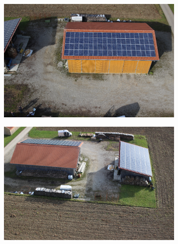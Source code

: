 \documentclass[remotesensing,article,accept,moreauthors,pdftex,10pt,a4paper]{mdpi}
\theoremstyle{mdpi}
\newcounter{ex}
\newcounter{re}
\begin{document}
\begin{figure}[H]
    \centering
       \begin{subfigure}[tbp]{0.24\columnwidth}
           \centering
           \includegraphics[width=\textwidth]{segment/fin_ori1.png}
           \caption[]{}
           {{\small }}
           \label{fig:4a}
       \end{subfigure}
       \begin{subfigure}[tbp]{0.24\columnwidth}
           \centering
           \includegraphics[width=\textwidth]{segment/fin_ori2.png}
           \caption[]{}%
           {{\small }}
           \label{fig:4b}
       \end{subfigure}
       \hfill
       \begin{subfigure}[tbp]{0.24\columnwidth}
           \centering

\end{subfigure}
\end{figure}
\end{document}
